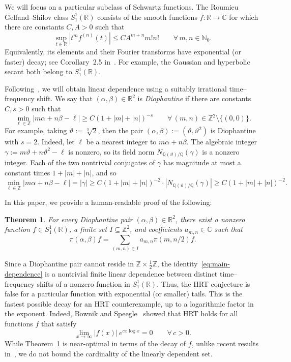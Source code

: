 \documentclass[10pt,a4paper]{amsart}
\newtheorem{theorem}{Theorem}
\newcommand{\R}{\mathbb{R}}
\newcommand{\C}{\mathbb{C}}
\newcommand{\Z}{\mathbb{Z}}
\begin{document}
We will focus on a particular subclass of Schwartz functions.
The Roumieu Gelfand--Shilov class $S_1^1(\R)$ consists of the smooth functions
$f\colon\R\to\C$ for which there are constants $C,A>0$ such that
\[
  \sup_{t\in\R}|t^m f^{(n)}(t)|
  \leq CA^{m+n}m!n!
  \qquad\forall\,m,n\in\mathbb{N}_0.
\] 
Equivalently, its elements and their Fourier transforms
have exponential (or faster) decay; see Corollary~2.5 in~\cite{ChungChungKim:96}.  
For example, the Gaussian and hyperbolic secant both belong to $S_1^1(\R)$.

Following~\cite{FaulhuberPvC:26}, we will obtain linear dependence using a suitably irrational time--frequency shift.
We say that
$(\alpha,\beta)\in\R^2$ is \emph{Diophantine} if there are constants
$C,s>0$ such that
\[
  \min_{\ell\in\Z}|m\alpha+n\beta-\ell|
  \geq C(1+|m|+|n|)^{-s}
  \qquad\forall\,(m,n)\in\Z^2\setminus\{(0,0)\}.
\]
For example, taking $\vartheta:=\sqrt[3]{2}$, then the pair
$
  (\alpha,\beta):=(\vartheta,\vartheta^2)
$
is Diophantine with $s=2$.  Indeed, let $\ell$ be a nearest integer to
$m\alpha+n\beta$.  The algebraic integer
$\gamma
:=m\vartheta+n\vartheta^2-\ell$
is nonzero, so its field norm $N_{\mathbb{Q}(\vartheta)/\mathbb{Q}}(\gamma)$ is a nonzero integer.  Each of the two nontrivial conjugates of $\gamma$ has
magnitude at most a constant times $1+|m|+|n|$, and so
\[
\min_{\ell\in\Z}|m\alpha+n\beta-\ell|
=|\gamma|
\geq C(1+|m|+|n|)^{-2} \cdot |N_{\mathbb{Q}(\vartheta)/\mathbb{Q}}(\gamma)|
\geq C(1+|m|+|n|)^{-2}.
\]

In this paper, we provide a human-readable proof of the following:


\begin{theorem}\label{thm:main}
For every Diophantine pair $(\alpha,\beta)\in\R^2$, there exist a nonzero
function $f\in S_1^1(\R)$, a finite set $I\subseteq\Z^2$, and coefficients
$a_{m,n}\in\C$ such that
\begin{equation}
\label{eq:main-dependence}
  \pi(\alpha,\beta)f
  =\sum_{(m,n)\in I}a_{m,n}\pi(m,n/2)f.
\end{equation}
\end{theorem}


Since a Diophantine pair cannot reside in
$\Z\times\tfrac12\Z$, the identity~\eqref{eq:main-dependence} is a
nontrivial finite linear dependence between distinct time--frequency shifts of
a nonzero function in $S_1^1(\R)$.  Thus,  the HRT conjecture is false for a particular function with exponential (or smaller) tails.
This is the
fastest possible decay for an HRT counterexample, up to a logarithmic
factor in the exponent.
Indeed, Bownik and Speegle~\cite{BownikS:13} showed that HRT holds for all functions $f$ that satisfy
\[
\lim_{x\to\infty}
|f(x)|\,e^{cx \log x} = 0 
\qquad
\forall\, c > 0.
\]
While Theorem~\ref{thm:main} is near-optimal in terms of the decay of $f$, unlike recent results in~\cite{FaulhuberPvC:26,Oussa:26,DaiDSWY:26}, we do not bound the cardinality of the linearly dependent set.
\end{document}
